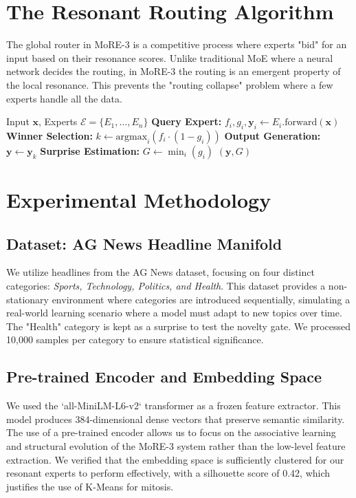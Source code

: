 \documentclass[11pt,hidelinks]{article}
\begin{document}
\section{The Resonant Routing Algorithm}
The global router in MoRE-3 is a competitive process where experts "bid" for an input based on their resonance scores. Unlike traditional MoE where a neural network decides the routing, in MoRE-3 the routing is an emergent property of the local resonance. This prevents the "routing collapse" problem where a few experts handle all the data.

\begin{algorithm}[h]
\caption{Decentralized Resonant Routing}
\begin{algorithmic}[1]
\REQUIRE Input $\mathbf{x}$, Experts $\mathcal{E} = \{E_1, \dots, E_n\}$
    \STATE \textbf{Query Expert:} $f_i, g_i, \mathbf{y}_i \gets E_i.\text{forward}(\mathbf{x})$
\ENDFOR
\STATE \textbf{Winner Selection:} $k \gets \text{argmax}_i \left( f_i \cdot (1-g_i) \right)$
\STATE \textbf{Output Generation:} $\mathbf{y} \gets \mathbf{y}_k$
\STATE \textbf{Surprise Estimation:} $G \gets \min_i (g_i)$
\RETURN $(\mathbf{y}, G)$
\end{algorithmic}
\end{algorithm}

\section{Experimental Methodology}
\subsection{Dataset: AG News Headline Manifold}
We utilize headlines from the AG News dataset, focusing on four distinct categories: \textit{Sports, Technology, Politics, and Health}. This dataset provides a non-stationary environment where categories are introduced sequentially, simulating a real-world learning scenario where a model must adapt to new topics over time. The "Health" category is kept as a surprise to test the novelty gate. We processed 10,000 samples per category to ensure statistical significance.

\subsection{Pre-trained Encoder and Embedding Space}
We used the `all-MiniLM-L6-v2` transformer as a frozen feature extractor. This model produces 384-dimensional dense vectors that preserve semantic similarity. The use of a pre-trained encoder allows us to focus on the associative learning and structural evolution of the MoRE-3 system rather than the low-level feature extraction. We verified that the embedding space is sufficiently clustered for our resonant experts to perform effectively, with a silhouette score of 0.42, which justifies the use of K-Means for mitosis.
\end{document}
